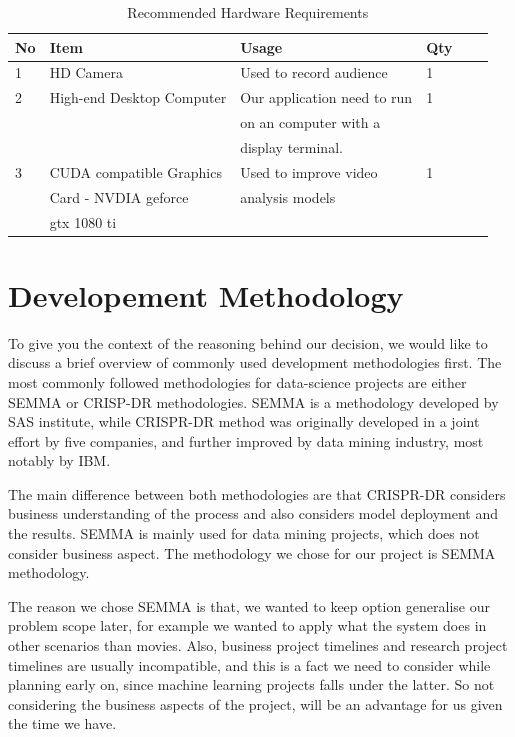 \documentclass[12pt,a4paper,man]{report}
\begin{document}
\begin{table}[htbp]
\caption{\label{table:mxreq}
Recommended Hardware Requirements}
\centering
\begin{tabular}{|l|l|l|l|lp{3cm}|}
\hline
No & Item & Usage & Qty\\
\hline
1 & HD Camera & Used to record audience & 1\\
2 & High-end Desktop Computer & Our application need to run & 1\\
 &  & on an computer with a & \\
 &  & display terminal. & \\
3 & CUDA compatible Graphics & Used to improve video & 1\\
 & Card - NVDIA geforce & analysis models & \\
 & gtx 1080 ti &  & \\
\hline
\end{tabular}
\end{table}

\chapter{Developement Methodology}
\label{sec:orgd913fe2}
To give you the context of the reasoning behind our decision, we would like to discuss a brief overview of commonly used development methodologies first. The most commonly followed methodologies for data-science projects are either SEMMA or CRISP-DR methodologies. SEMMA is a methodology developed by SAS institute, while CRISPR-DR method was originally developed in a joint effort by five companies, and further improved by data mining industry, most notably by IBM. 

The main difference between both methodologies are that CRISPR-DR considers business understanding of the process and also considers model deployment and the results. SEMMA is mainly used for data mining projects, which does not consider business aspect. The methodology we chose for our project is SEMMA methodology.

The reason we chose SEMMA is that, we wanted to keep option generalise our problem scope later, for example we wanted to apply what the system does in other scenarios than movies. Also, business project timelines and research project timelines are usually incompatible, and this is a fact we need to consider while planning early on, since machine learning projects falls under the latter. So not considering the business aspects of the project, will be an advantage for us given the time we  have. 
\end{document}
